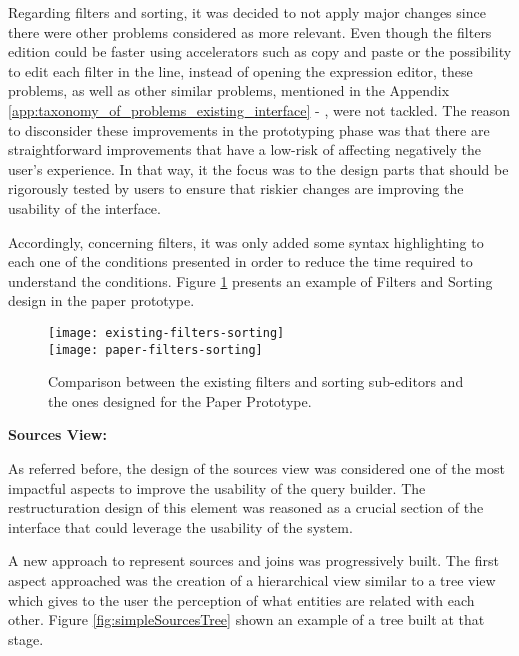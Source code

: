 Regarding filters and sorting, it was decided to not apply major changes since there were other problems considered as more relevant. Even though the filters edition could be faster using accelerators such as copy and paste or the possibility to edit each filter in the line, instead of opening the expression editor, these problems, as well as other similar problems, mentioned in the Appendix \ref{app:taxonomy_of_problems_existing_interface} - , were not tackled. The reason to disconsider these improvements in the prototyping phase was that there are straightforward improvements that have a low-risk of affecting negatively the user's experience. In that way, it the focus was to the design parts that should be rigorously tested by users to ensure that riskier changes are improving the usability of the interface.

Accordingly, concerning filters, it was only added some syntax highlighting to each one of the conditions presented in order to reduce the time required to understand the conditions. Figure \ref{fig:filtersAndSortingComparison} presents an example of Filters and Sorting design in the paper prototype.

\begin{figure}[tb]
  \centering
    {\texttt{[image: existing-filters-sorting]}}%
    \\
  {\texttt{[image: paper-filters-sorting]}}%
\caption{Comparison between the existing filters and sorting sub-editors and the ones designed for the Paper Prototype.}
  \label{fig:filtersAndSortingComparison}
\end{figure}

\medskip

\textbf{Sources View: }

\medskip

As referred before, the design of the sources view was considered one of the most impactful aspects to improve the usability of the query builder. The restructuration design of this element was reasoned as a crucial section of the interface that could leverage the usability of the system. 

A new approach to represent sources and joins was progressively built. The first aspect approached was the creation of a hierarchical view similar to a tree view which gives to the user the perception of what entities are related with each other. Figure \ref{fig:simpleSourcesTree} shown an example of a tree built at that stage.

